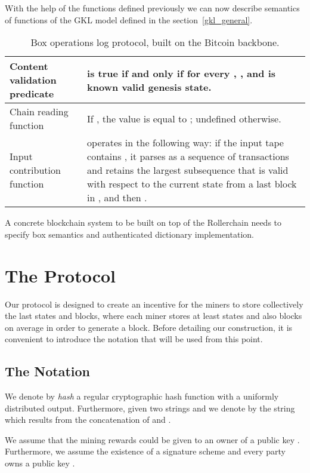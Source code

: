 \documentclass[conference,compsoc]{IEEEtran}
\begin{document}
With the help of the functions defined previously we can now describe semantics of  functions of the GKL model defined in the section~\ref{gkl_general}.

\begin{table}[H]
\caption{Box operations log protocol, built on the Bitcoin backbone.}
\label{operations}
\begin{tabular}{ |l|p{10cm}| }  
  \hline
  Content validation predicate  &  is true if and only if for every , , and  is known valid genesis state. \\
  \hline
  Chain reading function  & If , the value  is equal to ; undefined otherwise. \\
  \hline
  Input contribution function  &   operates in the following way: if the input tape contains , it parses  as a sequence of transactions and retains the largest subsequence  that is valid with respect to the current state  from a last block in , and then . \\
  \hline
\end{tabular}
\end{table}

A concrete blockchain system to be built on top of the Rollerchain needs to specify box semantics and authenticated dictionary implementation. 

\section{The Protocol}
\label{protocol}

Our protocol is designed to create an incentive for the miners to store collectively the last  states and blocks, where each miner stores at least  states and also  blocks on average in order to generate a block. Before detailing our construction, it is convenient to introduce the notation that will be used from this point.

\subsection{The Notation}

We denote by \textit{hash}  a regular cryptographic hash function with a uniformly distributed output. Furthermore, given two strings  and  we denote by  the string which results from the concatenation of  and .

We assume that the mining rewards could be given to an owner of a public key . Furthermore, we assume the existence of a signature scheme and every party owns a public key . 
\end{document}
